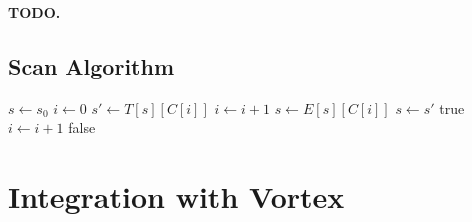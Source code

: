 \documentclass[sigconf,nonacm]{acmart}
\begin{document}
\textbf{TODO.}


\subsection{Scan Algorithm}
\label{sec:scan}


\begin{algorithm}
\caption{DFA scan over FSST-compressed codes}\label{alg:scan}
\begin{algorithmic}[1]
\Require{code stream $C[0..n)$, symbol table $T$, escape table $E$, sentinel $\sigma$}
\State $s \gets s_0$ 
\State $i \gets 0$
    \State $s' \gets T[s][C[i]]$
     
        \State $i \gets i + 1$
        \State $s \gets E[s][C[i]]$
    \Else {}
        \State $s \gets s'$
    \EndIf
     \Return true
    \EndIf
    \State $i \gets i + 1$
\EndWhile
\State \Return false
\end{algorithmic}
\end{algorithm}


\section{Integration with Vortex}
\label{sec:integration}


\end{document}
